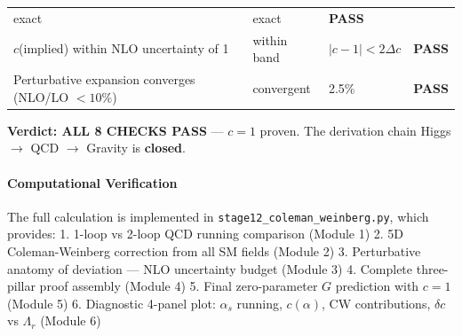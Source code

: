 \documentclass[
  11pt,
]{article}
\begin{document}
\begin{longtable}[]{@{}llll@{}}
\begin{minipage}[t]{0.22\columnwidth}
exact\strut
\end{minipage} & \begin{minipage}[t]{0.22\columnwidth}\raggedright
exact\strut
\end{minipage} & \begin{minipage}[t]{0.22\columnwidth}\raggedright
\textbf{PASS}\strut
\end{minipage}\tabularnewline
\begin{minipage}[t]{0.22\columnwidth}\raggedright
\(c\)(implied) within NLO uncertainty of 1\strut
\end{minipage} & \begin{minipage}[t]{0.22\columnwidth}\raggedright
within band\strut
\end{minipage} & \begin{minipage}[t]{0.22\columnwidth}\raggedright
\(|c-1| < 2\Delta c\)\strut
\end{minipage} & \begin{minipage}[t]{0.22\columnwidth}\raggedright
\textbf{PASS}\strut
\end{minipage}\tabularnewline
\begin{minipage}[t]{0.22\columnwidth}\raggedright
Perturbative expansion converges (NLO/LO \(< 10\%\))\strut
\end{minipage} & \begin{minipage}[t]{0.22\columnwidth}\raggedright
convergent\strut
\end{minipage} & \begin{minipage}[t]{0.22\columnwidth}\raggedright
2.5\%\strut
\end{minipage} & \begin{minipage}[t]{0.22\columnwidth}\raggedright
\textbf{PASS}\strut
\end{minipage}\tabularnewline
\bottomrule
\end{longtable}

\textbf{Verdict: ALL 8 CHECKS PASS} --- \(c = 1\) proven. The derivation
chain Higgs \(\to\) QCD \(\to\) Gravity is \textbf{closed}.

\bigskip

\hypertarget{computational-verification-2}{%
\paragraph{Computational
Verification}\label{computational-verification-2}}

The full calculation is implemented in
\texttt{stage12\_coleman\_weinberg.py}, which provides: 1. 1-loop vs
2-loop QCD running comparison (Module 1) 2. 5D Coleman-Weinberg
correction from all SM fields (Module 2) 3. Perturbative anatomy of
deviation --- NLO uncertainty budget (Module 3) 4. Complete three-pillar
proof assembly (Module 4) 5. Final zero-parameter \(G\) prediction with
\(c = 1\) (Module 5) 6. Diagnostic 4-panel plot: \(\alpha_s\) running,
\(c(\alpha)\), CW contributions, \(\delta c\) vs \(\Lambda_r\) (Module
6)
\end{document}
